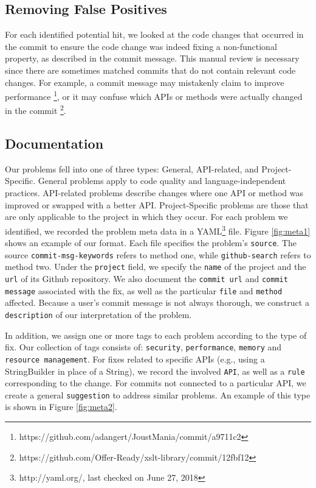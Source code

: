 \documentclass[sigconf]{acmart}
\begin{document}
\subsection{Removing False Positives}

For each identified potential hit, we looked at the code changes that occurred in the commit to ensure the code change was indeed fixing a non-functional property, as described in the commit message. This manual review is necessary since there are sometimes matched commits that do not contain relevant code changes. For example, a commit message may mistakenly claim to improve performance \footnote{https://github.com/adangert/JoustMania/commit/a9711c2}, or it may confuse which APIs or methods were actually changed in the commit \footnote{https://github.com/Offer-Ready/xslt-library/commit/12fbf12}.

\subsection{Documentation} 
Our problems fell into one of three types: General, API-related, and Project-Specific. General problems apply to code quality and language-independent practices. API-related problems describe changes where one API or method was improved or swapped with a better API. Project-Specific problems are those that are only applicable to the project in which they occur.
For each problem we identified, we recorded the problem meta data in a YAML\footnote{http://yaml.org/, last checked on June 27, 2018} file. Figure \ref{fig:meta1} shows an example of our format. Each file specifies the problem's \texttt{source}. The source \texttt{commit-msg-keywords} refers to method one, while \texttt{github-search} refers to method two. Under the \texttt{project} field, we specify the \texttt{name} of the project and the \texttt{url} of its Github repository. We also document the \texttt{commit url} and \texttt{commit message} associated with the fix, as well as the particular \texttt{file} and \texttt{method} affected. Because a user's commit message is not always thorough, we construct a \texttt{description} of our interpretation of the problem.

In addition, we assign one or more tags to each problem according to the type of fix. Our collection of tags consists of: \texttt{security}, \texttt{performance}, \texttt{memory}  and \texttt{resource management}. For fixes related to specific APIs (e.g., using a StringBuilder in place of  a String), we record the involved \texttt{API}, as well as a \texttt{rule} corresponding to the change. For commits not connected to a particular API, we create a general \texttt{suggestion} to address similar problems. An example of this type is shown in Figure \ref{fig:meta2}. 
\end{document}
